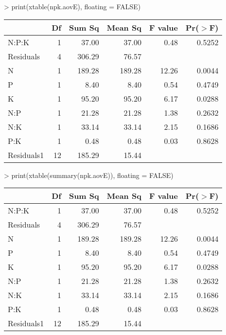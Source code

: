 \documentclass[letterpaper]{article}
\begin{document}
\begin{Schunk}
\begin{Sinput}
> print(xtable(npk.aovE), floating = FALSE)
\end{Sinput}
% latex table generated in R 2.6.0 by xtable 1.5-2 package
% Wed Oct 10 14:26:36 2007
\begin{tabular}{lrrrrr}
  \hline
 & Df & Sum Sq & Mean Sq & F value & Pr($>$F) \\
  \hline
N:P:K     & 1 & 37.00 & 37.00 & 0.48 & 0.5252 \\
  Residuals & 4 & 306.29 & 76.57 &  &  \\
  N         & 1 & 189.28 & 189.28 & 12.26 & 0.0044 \\
  P         & 1 & 8.40 & 8.40 & 0.54 & 0.4749 \\
  K         & 1 & 95.20 & 95.20 & 6.17 & 0.0288 \\
  N:P       & 1 & 21.28 & 21.28 & 1.38 & 0.2632 \\
  N:K       & 1 & 33.14 & 33.14 & 2.15 & 0.1686 \\
  P:K       & 1 & 0.48 & 0.48 & 0.03 & 0.8628 \\
  Residuals1 & 12 & 185.29 & 15.44 &  &  \\
   \hline
\end{tabular}\end{Schunk}


\begin{Schunk}
\begin{Sinput}
> print(xtable(summary(npk.aovE)), floating = FALSE)
\end{Sinput}
% latex table generated in R 2.6.0 by xtable 1.5-2 package
% Wed Oct 10 14:26:36 2007
\begin{tabular}{lrrrrr}
  \hline
 & Df & Sum Sq & Mean Sq & F value & Pr($>$F) \\
  \hline
N:P:K     & 1 & 37.00 & 37.00 & 0.48 & 0.5252 \\
  Residuals & 4 & 306.29 & 76.57 &  &  \\
  N         & 1 & 189.28 & 189.28 & 12.26 & 0.0044 \\
  P         & 1 & 8.40 & 8.40 & 0.54 & 0.4749 \\
  K         & 1 & 95.20 & 95.20 & 6.17 & 0.0288 \\
  N:P       & 1 & 21.28 & 21.28 & 1.38 & 0.2632 \\
  N:K       & 1 & 33.14 & 33.14 & 2.15 & 0.1686 \\
  P:K       & 1 & 0.48 & 0.48 & 0.03 & 0.8628 \\
  Residuals1 & 12 & 185.29 & 15.44 &  &  \\
   \hline
\end{tabular}\end{Schunk}
\end{document}
